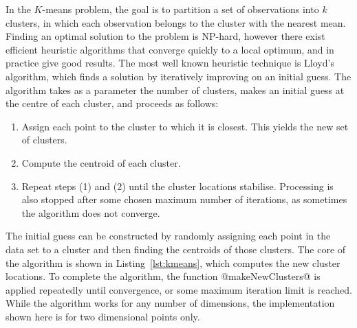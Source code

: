 In the $K$-means problem, the goal is to partition a set of observations into
$k$ clusters, in which each observation belongs to the cluster with the nearest
mean. Finding an optimal solution to the problem is NP-hard, however there exist
efficient heuristic algorithms that converge quickly to a local optimum, and in
practice give good results. The most well known heuristic technique is Lloyd's
algorithm, which finds a solution by iteratively improving on an initial guess.
The algorithm takes as a parameter the number of clusters, makes an initial
guess at the centre of each cluster, and proceeds as follows:
%
\begin{enumerate}
    \item Assign each point to the cluster to which it is closest. This yields
        the new set of clusters.

    \item Compute the centroid of each cluster.

    \item Repeat steps (1) and (2) until the cluster locations stabilise.
        Processing is also stopped after some chosen maximum number of
        iterations, as sometimes the algorithm does not converge.
\end{enumerate}
%
The initial guess can be constructed by randomly assigning each point in the
data set to a cluster and then finding the centroids of those clusters. The core
of the algorithm is shown in Listing~\ref{lst:kmeans}, which computes the new
cluster locations. To complete the algorithm, the function @makeNewClusters@ is
applied repeatedly until convergence, or some maximum iteration limit is
reached. While the algorithm works for any number of dimensions, the
implementation shown here is for two dimensional points only.

